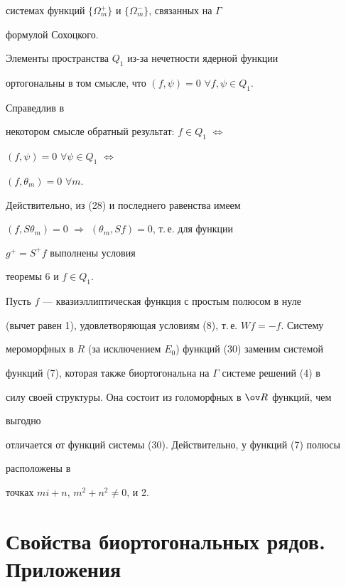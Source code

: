 системах функций $\{\Omega^+_m\}$ и $\{\Omega^-_m\}$, связанных на $\Gamma$ 


формулой Сохоцкого. 


 


Элементы пространства $Q_1$ из-за нечетности ядерной функции 


ортогональны в том смысле, что $(f,\psi)=0$ $\forall f,\psi\in Q_1$. 


Справедлив в 


некотором смысле обратный результат: $f\in Q_1$ $\Leftrightarrow$ 


$(f,\psi)=0$ $\forall \psi\in Q_1$ $\Leftrightarrow$


$(f,\theta_m)=0$ $\forall m$. 


Действительно, из (28) и последнего равенства имеем 


$(f,S\theta_m)=0$ $\Rightarrow$ $(\theta_m,Sf)=0$, т.\,е. для функции 


$g^+=S^+f$ выполнены условия 


теоремы 6 и $f\in Q_1$. 


 


Пусть $f$ --- квазиэллиптическая функция с простым полюсом в нуле 


(вычет равен 1), удовлетворяющая условиям (8), т.\,е. $Wf=-f$. Систему 


мероморфных в $R$ (за исключением $E_0$) функций (30) заменим системой 


функций (7), которая также биортогональна на $\Gamma$ системе решений (4) в 


силу своей структуры. Она состоит из голоморфных в $\ov R$ функций, чем 


выгодно 


отличается от функций системы (30). Действительно, у функций (7) полюсы


расположены в 


точках $mi+n$, $m^2+n^2\ne0$, и 2. 


 


 


\section{Свойства биортогональных рядов. Приложения} 


 


 


